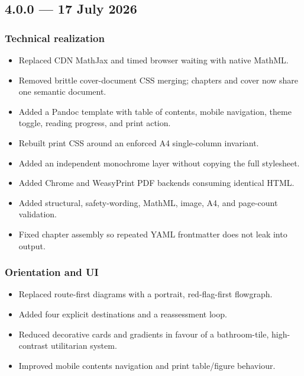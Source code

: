 \hypertarget{july-2026}{%
\subsection{4.0.0 --- 17 July 2026}\label{july-2026}}

\hypertarget{technical-realization}{%
\subsubsection{Technical realization}\label{technical-realization}}

\begin{itemize}
\tightlist
\item
  Replaced CDN MathJax and timed browser waiting with native MathML.
\item
  Removed brittle cover-document CSS merging; chapters and cover now
  share one semantic document.
\item
  Added a Pandoc template with table of contents, mobile navigation,
  theme toggle, reading progress, and print action.
\item
  Rebuilt print CSS around an enforced A4 single-column invariant.
\item
  Added an independent monochrome layer without copying the full
  stylesheet.
\item
  Added Chrome and WeasyPrint PDF backends consuming identical HTML.
\item
  Added structural, safety-wording, MathML, image, A4, and page-count
  validation.
\item
  Fixed chapter assembly so repeated YAML frontmatter does not leak into
  output.
\end{itemize}

\hypertarget{orientation-and-ui}{%
\subsubsection{Orientation and UI}\label{orientation-and-ui}}

\begin{itemize}
\tightlist
\item
  Replaced route-first diagrams with a portrait, red-flag-first
  flowgraph.
\item
  Added four explicit destinations and a reassessment loop.
\item
  Reduced decorative cards and gradients in favour of a bathroom-tile,
  high-contrast utilitarian system.
\item
  Improved mobile contents navigation and print table/figure behaviour.
\end{itemize}

